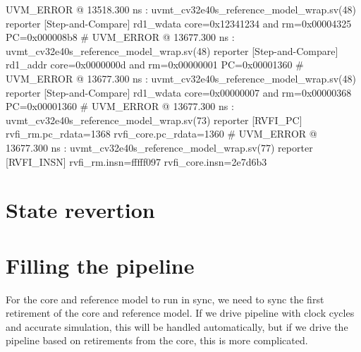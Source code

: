 \begin{terminal}[caption={Errors from division test.}, label={lst:divtest_error}]
UVM_ERROR @ 13518.300 ns : uvmt_cv32e40s_reference_model_wrap.sv(48) reporter [Step-and-Compare] rd1_wdata core=0x12341234 and rm=0x00004325 PC=0x000008b8
# UVM_ERROR @ 13677.300 ns : uvmt_cv32e40s_reference_model_wrap.sv(48) reporter [Step-and-Compare] rd1_addr core=0x0000000d and rm=0x00000001 PC=0x00001360
# UVM_ERROR @ 13677.300 ns : uvmt_cv32e40s_reference_model_wrap.sv(48) reporter [Step-and-Compare] rd1_wdata core=0x00000007 and rm=0x00000368 PC=0x00001360
# UVM_ERROR @ 13677.300 ns : uvmt_cv32e40s_reference_model_wrap.sv(73) reporter [RVFI_PC] rvfi_rm.pc_rdata=1368 rvfi_core.pc_rdata=1360
# UVM_ERROR @ 13677.300 ns : uvmt_cv32e40s_reference_model_wrap.sv(77) reporter [RVFI_INSN] rvfi_rm.insn=fffff097 rvfi_core.insn=2e7d6b3
\end{terminal}

\section{State revertion}



\textbf{}


%
%
%

\section{Filling the pipeline}

For the core and reference model to run in sync, we need to sync the first retirement of the core and reference model. If we drive pipeline with clock cycles and accurate simulation, this will be handled automatically, but if we drive the pipeline based on retirements from the core, this is more complicated.

